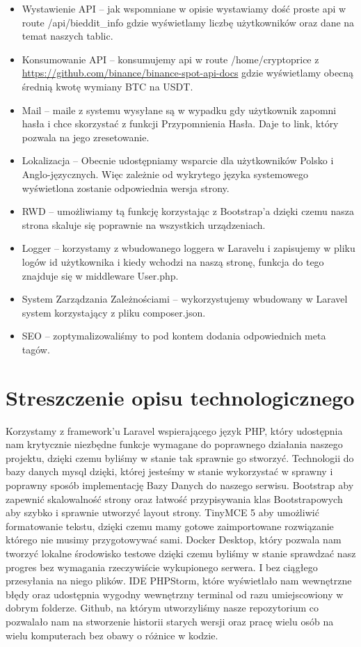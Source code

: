 \documentclass{article}
\begin{document}
\begin{itemize}
\item Wystawienie API – jak wspomniane w opisie wystawiamy dość proste api w route /api/bieddit\_info gdzie wyświetlamy liczbę użytkowników oraz dane na temat naszych tablic.
\item Konsumowanie API – konsumujemy api w route /home/cryptoprice z \url{https://github.com/binance/binance-spot-api-docs} gdzie wyświetlamy obecną średnią kwotę wymiany BTC na USDT.
\item Mail – maile z systemu wysyłane są w wypadku gdy użytkownik zapomni hasła i chce skorzystać z funkcji Przypomnienia Hasła. Daje to link, który pozwala na jego zresetowanie.
\item Lokalizacja – Obecnie udostępniamy wsparcie dla użytkowników Polsko i Anglo-języcznych. Więc zależnie od wykrytego języka systemowego wyświetlona zostanie odpowiednia wersja strony.
\item RWD – umożliwiamy tą funkcję korzystając z Bootstrap’a dzięki czemu nasza strona skaluje się poprawnie na wszystkich urządzeniach.
\item Logger – korzystamy z wbudowanego loggera w Laravelu i zapisujemy w pliku logów id użytkownika i kiedy wchodzi na naszą stronę, funkcja do tego znajduje się w middleware User.php.
\item System Zarządzania Zależnościami – wykorzystujemy wbudowany w Laravel system korzystający z pliku composer.json.
\item SEO – zoptymalizowaliśmy to pod kontem dodania odpowiednich meta tagów.
\end{itemize}

\section{Streszczenie opisu technologicznego}
Korzystamy z framework'u Laravel wspierającego język PHP, który udostępnia nam krytycznie niezbędne funkcje wymagane do poprawnego działania naszego projektu, dzięki czemu byliśmy w stanie tak sprawnie go stworzyć.
Technologii do bazy danych mysql dzięki, której jesteśmy w stanie wykorzystać w sprawny i poprawny sposób implementację Bazy Danych do naszego serwisu. 
Bootstrap aby zapewnić skalowalność strony oraz łatwość przypisywania klas Bootstrapowych aby szybko i sprawnie utworzyć layout strony. 
TinyMCE 5 aby umożliwić formatowanie tekstu, dzięki czemu mamy gotowe zaimportowane rozwiązanie którego nie musimy przygotowywać sami.
Docker Desktop, który pozwala nam tworzyć lokalne środowisko testowe dzięki czemu byliśmy w stanie sprawdzać nasz progres bez wymagania rzeczywiście wykupionego serwera. I bez ciągłego przesyłania na niego plików.
IDE PHPStorm, które wyświetlało nam wewnętrzne błędy oraz udostępnia wygodny wewnętrzny terminal od razu umiejscowiony w dobrym folderze.
Github, na którym utworzyliśmy nasze repozytorium co pozwalało nam na stworzenie historii starych wersji oraz pracę wielu osób na wielu komputerach bez obawy o różnice w kodzie.
\end{document}
